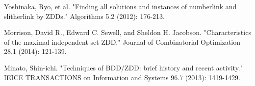 \documentclass[12pt,a4paper,twoside]{article}
\begin{document}
\begin{thebibliography}{9}

Yoshinaka, Ryo, et al. "Finding all solutions and instances of numberlink and slitherlink by ZDDs." Algorithms 5.2 (2012): 176-213.

Morrison, David R., Edward C. Sewell, and Sheldon H. Jacobson. "Characteristics of the maximal independent set ZDD." Journal of Combinatorial Optimization 28.1 (2014): 121-139.

Minato, Shin-ichi. "Techniques of BDD/ZDD: brief history and recent activity." IEICE TRANSACTIONS on Information and Systems 96.7 (2013): 1419-1429.

\end{thebibliography}
\end{document}

